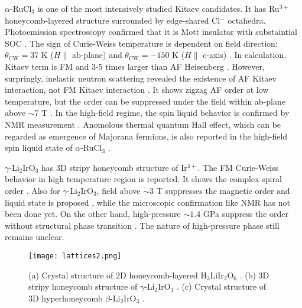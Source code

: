 \documentclass[a4,10.5pt]{report}
\begin{document}
$\alpha$-RuCl$_3$ is one of the most intensively studied Kitaev candidates.
It has Ru$^{3+}$ honeycomb-layered structure surrounded by edge-shared Cl$^-$ octahedra.
Photoemission spectroscopy confirmed that it is Mott insulator with substaintial SOC \cite{koitzsch2016j}.
The sign of Curie-Weiss temperature is dependent on field direction: $\theta_{\mathrm{CW}} = 37$ K ($H \parallel$ ab-plane) and 
$\theta_{\mathrm{CW}} = -150$ K ($H \parallel$ c-axis) \cite{majumder2015anisotropic}.
In calculation, Kitaev term is FM and 3-5 times larger than AF Heisenberg \cite{yadav2016kitaev}.
However, surpringly, inelastic neutron scattering revealed the existence of AF Kitaev interaction, not FM Kitaev interaction \cite{banerjee2017neutron}.
It shows zigzag AF order at low temperature, but the order can be suppressed under the field within ab-plane above $\sim 7$ T \cite{kasahara2018majorana}. 
In the high-field regime, the spin liquid behavior is confirmed by NMR measurement \cite{baek2017evidence}.
Anomolous thermal quantum Hall effect, which can be regarded as emergence of Majorana fermions, is also reported in the high-field spin liquid state of $\alpha$-RuCl$_3$ 
\cite{kasahara2018majorana}.

$\gamma$-Li$_2$IrO$_3$ \cite{modic2014realization} has 3D stripy honeycomb structure of Ir$^{4+}$.
The FM Curie-Weiss behavior in high temperature region is reported.
It shows the complex spiral order \cite{biffin2014noncoplanar}.
Also for $\gamma$-Li$_2$IrO$_3$, field above $\sim 3$ T suppresses the magnetic order and liquid state is proposed \cite{modic2017robust}, 
while the microscopic confirmation like NMR has not been done yet.
On the other hand, high-pressure $\sim 1.4$ GPa suppress the order without structural phase transition \cite{breznay2017resonant}.
The nature of high-pressure phase still remains unclear.

\begin{figure}
  \centering
  \texttt{[image: lattices2.png]}
  \caption{(a) Crystal structure of 2D honeycomb-layered H$_3$LiIr$_2$O$_6$ \cite{kitagawa2018spin}.
  (b) 3D stripy honeycomb structure of $\gamma$-Li$_2$IrO$_3$ \cite{modic2014realization}.
  (c) Crystal structure of 3D hyperhoneycomb $\beta$-Li$_2$IrO$_3$ \cite{takayama2015hyperhoneycomb}.}
  \label{lattices}
\end{figure}
\end{document}

